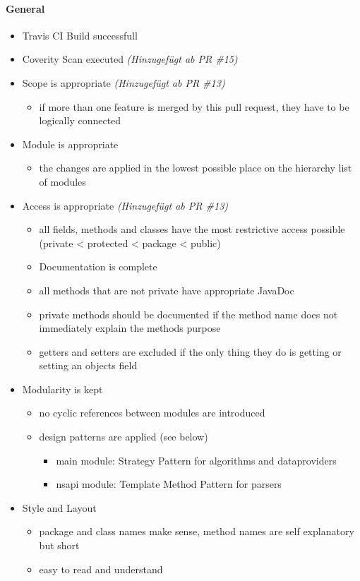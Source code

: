 \documentclass[accentcolor=tud0b,12pt,paper=a4]{tudreport}
\begin{document}
\paragraph{General}
\begin{itemize}
\item Travis CI Build successfull
\item Coverity Scan executed \textit{(Hinzugefügt ab PR \#15)}
\item Scope is appropriate \textit{(Hinzugefügt ab PR \#13)}
	\begin{itemize}
	\item if more than one feature is merged by this pull request, they have to be logically connected
	\end{itemize}
\item Module is appropriate
	\begin{itemize}
	\item the changes are applied in the lowest possible place on the hierarchy list of modules
	\end{itemize}
\item Access is appropriate \textit{(Hinzugefügt ab PR \#13)}
	\begin{itemize}
	\item all fields, methods and classes have the most restrictive access possible (private < protected < package < public)
\item Documentation is complete
	\end{itemize}
	\begin{itemize}
	\item all methods that are not private have appropriate JavaDoc
	\item private methods should be documented if the method name does not immediately explain the methods purpose
	\item getters and setters are excluded if the only thing they do is getting or setting an objects field
	\end{itemize}
\item Modularity is kept
	\begin{itemize}
	\item no cyclic references between modules are introduced
	\item design patterns are applied (see below)
		\begin{itemize}
		\item main module: Strategy Pattern for algorithms and dataproviders
		\item nsapi module: Template Method Pattern for parsers
		\end{itemize}
	\end{itemize}
\item Style and Layout
	\begin{itemize}
	\item package and class names make sense, method names are self explanatory but short
	\item easy to read and understand
	\end{itemize}
\end{itemize}
\end{document}
